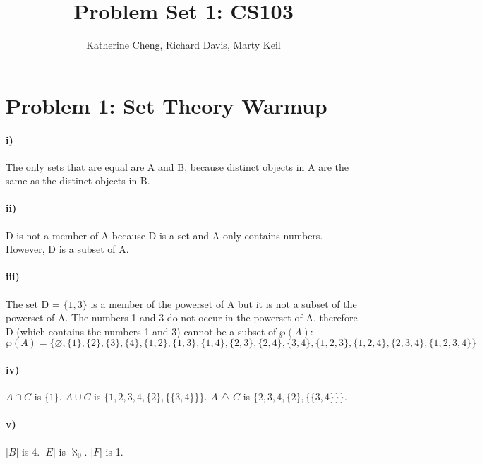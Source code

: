 \documentclass[10pt,letter]{article}
\begin{document}

\title{Problem Set 1: CS103}

\author{Katherine Cheng, Richard Davis, Marty Keil}

 
\maketitle 


\section*{Problem 1: Set Theory Warmup}

\paragraph{i)} The only sets that are equal are A and B, because distinct objects in A are the same as the distinct objects in B.
\paragraph{ii)} D is not a member of A because D is a set and A only contains numbers. However, D is a subset of A.

\paragraph{iii)} The set D = ${\{1,3\}}$ is a member of the powerset of A but it is not a subset of the powerset of A. The numbers 1 and 3 do not occur in the powerset of A, therefore D (which contains the numbers 1 and 3) cannot be a subset of $\wp(A)$:
$$ \wp(A) = \{ \varnothing, \{1\}, \{2\}, \{3\}, \{4\}, \{1,2\}, \{1,3\}, \{1,4\}, \{2,3\}, \{2,4\}, \{3,4\}, \{1,2,3\}, \{1,2,4\}, \{2,3,4\}, \{1,2,3,4\}\}$$

\paragraph{iv)} $A \cap C$ is ${\{1\}}$. $A \cup C$ is $\{1, 2, 3, 4, \{2\}, \{\{3, 4\}\}\}$. $A \bigtriangleup C$ is $\{2, 3, 4, \{2\}, \{\{3, 4\}\}\}$.

\paragraph{v)} $|B|$ is 4. $|E|$ is $\aleph_0$. $|F|$ is 1.
\end{document}
